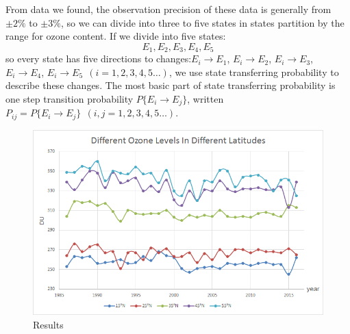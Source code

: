 \documentclass[12pt]{article}
\begin{document}
From data we found, the observation precision of these data is generally from $±2\%$  to $ ±3\%$, so we can divide into three to five states in states partition by the range for ozone content. If we divide into five states:$$E_1, E_2, E_3, E_4, E_5$$ so every state has five directions to changes:$E_i \to E_1$, $E_i \to E_2$, $E_i \to E_3$, $E_i \to E_4$, $E_i \to E_5 \ \ (i=1,2,3,4,5\ldots)$, we use state transferring probability to describe these changes. The most basic part of state transferring probability is one step transition probability $P\{E_i\to E_j\}$,  written $P_{ij}=P\{E_i\to E_j\}\ \ (i, j=1,2,3,4,5\ldots)$.

\begin{center}
\begin{figure}[htpb]
\centering
\includegraphics[scale=0.4]{mkv}
\caption{Results}\label{fig:xgxfx}
\end{figure}
\end{center}
\end{document}
